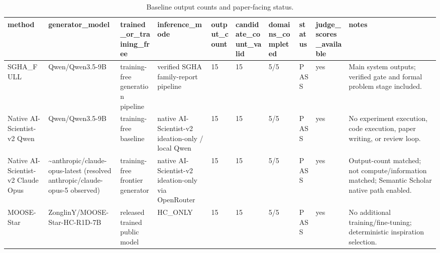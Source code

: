 \begin{table}[t]
\centering
\small
\begin{tabular}{llllllllll}
\toprule
method & generator\_model & trained\_or\_training\_free & inference\_mode & output\_count & candidate\_count\_valid & domains\_completed & status & judge\_scores\_available & notes \\
\midrule
SGHA\_FULL & Qwen/Qwen3.5-9B & training-free generation pipeline & verified SGHA family-report pipeline & 15 & 15 & 5/5 & PASS & yes & Main system outputs; verified gate and formal problem stage included. \\
Native AI-Scientist-v2 Qwen & Qwen/Qwen3.5-9B & training-free baseline & native AI-Scientist-v2 ideation-only / local Qwen & 15 & 15 & 5/5 & PASS & yes & No experiment execution, code execution, paper writing, or review loop. \\
Native AI-Scientist-v2 Claude Opus & \textasciitilde{}anthropic/claude-opus-latest (resolved anthropic/claude-opus-5 observed) & training-free frontier generator & native AI-Scientist-v2 ideation-only via OpenRouter & 15 & 15 & 5/5 & PASS & yes & Output-count matched; not compute/information matched; Semantic Scholar native path enabled. \\
MOOSE-Star & ZonglinY/MOOSE-Star-HC-R1D-7B & released trained public model & HC\_ONLY & 15 & 15 & 5/5 & PASS & yes & No additional training/fine-tuning; deterministic inspiration selection. \\
\bottomrule
\end{tabular}
\caption{Baseline output counts and paper-facing status.}
\label{tab:baseline_counts_status}
\end{table}
